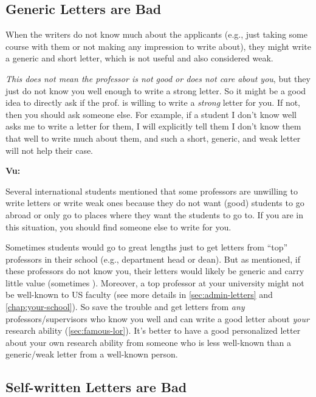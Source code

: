 \documentclass[oneside,11pt,dvipsnames]{book}
\newenvironment{commentbox}[1][]{
  \small
  \begin{mybox}
    {\small \textbf{#1}}
  }{
  \end{mybox}
}
\newcommand{\red}[1]{{\color{red}{#1}}}
\begin{document}
  
\subsection{Generic Letters are Bad}\label{sec:generic-letters} 
When the writers do not know much about the applicants (e.g., just taking some course with them or not making any impression to write about), they might write a generic and short letter, which is not useful and also considered weak. 

\emph{This does not mean the professor is not good or does not care about you}, but they just do not know you well enough to write a strong letter.
So it might be a good idea to directly ask if the prof. is willing to write a \emph{strong} letter for you. If not, then you should ask someone else.  For example, if a student I don't know well asks me to write a letter for them, I will explicitly tell them I don't know them that well to write much about them, and such a short, generic, and weak letter will not help their case.



\begin{commentbox}[Vu:]

  Several international students mentioned that some professors are unwilling to write letters or write weak ones because they do not want (good) students to go abroad or only go to places where they want the students to go to. If you are in this situation, you should find someone else to write for you.
  \tcblower

Sometimes students would go to great lengths just to get letters from ``top'' professors in their school (e.g., department head or dean). But as mentioned, if these professors do not know you, their letters would likely be generic and carry little value (sometimes \red{red flags}). Moreover, a top professor at your university might not be well-known to US faculty (see more details in \autoref{sec:admin-letters} and \autoref{chap:your-school}). So save the trouble and get letters from \emph{any} professors/supervisors who know you well and can write a good letter about \emph{your} research ability (\autoref{sec:famous-lor}). It's better to have a good personalized letter about your own research ability from someone who is less well-known than a generic/weak letter from a well-known person.

\end{commentbox}


\subsection{Self-written Letters are Bad}\label{sec:self-letters}
\end{document}
